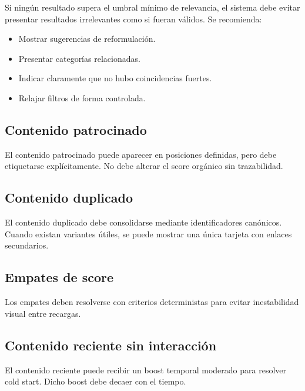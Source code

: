 \documentclass[12pt,a4paper]{article}
\begin{document}
Si ningún resultado supera el umbral mínimo de relevancia, el sistema debe evitar presentar resultados irrelevantes como si fueran válidos. Se recomienda:

\begin{itemize}[noitemsep]
    \item Mostrar sugerencias de reformulación.
    \item Presentar categorías relacionadas.
    \item Indicar claramente que no hubo coincidencias fuertes.
    \item Relajar filtros de forma controlada.
\end{itemize}

\subsection{Contenido patrocinado}

El contenido patrocinado puede aparecer en posiciones definidas, pero debe etiquetarse explícitamente. No debe alterar el score orgánico sin trazabilidad.

\subsection{Contenido duplicado}

El contenido duplicado debe consolidarse mediante identificadores canónicos. Cuando existan variantes útiles, se puede mostrar una única tarjeta con enlaces secundarios.

\subsection{Empates de score}

Los empates deben resolverse con criterios deterministas para evitar inestabilidad visual entre recargas.

\subsection{Contenido reciente sin interacción}

El contenido reciente puede recibir un boost temporal moderado para resolver cold start. Dicho boost debe decaer con el tiempo.
\end{document}
